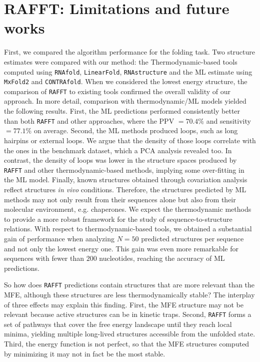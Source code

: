 \section{RAFFT: Limitations and future works }
First, we compared the algorithm performance for the folding task. Two structure estimates were compared with our method: the Thermodynamic-based tools computed using \texttt{RNAfold}, \texttt{LinearFold}, \texttt{RNAstructure} and the ML estimate using \texttt{MxFold2} and \texttt{CONTRAfold}. When we considered the lowest energy structure, the comparison of \texttt{RAFFT} to existing tools confirmed the overall validity of our approach. In more detail, comparison with thermodynamic/ML models yielded the following results. First, the ML predictions performed consistently better than both \texttt{RAFFT} and other approaches, where the PPV $=70.4\%$ and sensitivity $=77.1\%$ on average. Second, the ML methods produced loops, such as long hairpins or external loops. We argue that the density of those loops correlate with the ones in the benchmark dataset, which a PCA analysis revealed too. In contrast, the density of loops was lower in the structure spaces produced by \texttt{RAFFT} and other thermodynamic-based methods, implying some over-fitting in the ML model. Finally, known structures obtained through covariation analysis reflect structures \textit{in vivo} conditions. Therefore, the structures predicted by ML methods may not only result from their sequences alone but also from their molecular environment, e.g. chaperones. We expect the thermodynamic methods to provide a more robust framework for the study of sequence-to-structure relations.
With respect to thermodynamic-based tools, we obtained a substantial gain of performance when analyzing \(N=50\) predicted structures per sequence and not only the lowest energy one. This gain was even more remarkable for sequences with fewer than $200$ nucleotides, reaching the accuracy of ML predictions. 

So how does \texttt{RAFFT} predictions contain structures that are more relevant than the MFE, although these structures are less thermodynamically stable? The interplay of three effects may explain this finding. First, the MFE structure may not be relevant because active structures can be in kinetic traps. Second, \texttt{RAFFT} forms a set of pathways that cover the free energy landscape until they reach local minima, yielding multiple long-lived structures accessible from the unfolded state. Third, the energy function is not perfect, so that the MFE structures computed by minimizing it may not in fact be the most stable. 


